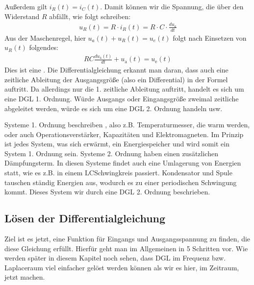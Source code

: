 \documentclass[letterpaper,10pt,english]{jupyterBook}
\begin{document}
\sphinxAtStartPar
Außerdem gilt \(i_R(t) = i_C(t)\). Damit können wir die Spannung, die über den Widerstand \(R\) abfällt, wie folgt schreiben:
\begin{equation*}
\begin{split}u_R(t) = R \cdot i_R(t) = R \cdot C\cdot \frac{du_a}{dt}\end{split}
\end{equation*}
\sphinxAtStartPar
Aus der Maschenregel, hier \( u_a(t) + u_R(t) = u_e(t)\) folgt nach Einsetzen von \(u_R(t)\) folgendes:
\begin{equation*}
\begin{split}RC \frac{du_\mathrm a (t)}{dt} + u_\mathrm a (t) = u_\mathrm e (t)\end{split}
\end{equation*}
\sphinxAtStartPar
Dies ist eine . Die Differentialgleichung erkannt man daran, dass auch eine zeitliche Ableitung der Ausgangsgröße (also ein Differential) in der Formel auftritt. Da allerdings nur die 1. zeitliche Ableitung auftritt, handelt es sich um eine DGL 1. Ordnung. Würde Ausgangs oder Eingangsgröße zweimal zeitliche abgeleitet werden, würde es sich um eine DGL 2. Ordnung handeln usw.

\sphinxAtStartPar
Systeme 1. Ordnung beschreiben , also z.B. Temperaturmesser, die warm werden, oder auch Operationsverstärker, Kapazitäten und Elektromagneten. Im Prinzip ist jedes System, was sich erwärmt, ein Energiespeicher und wird somit ein System 1. Ordnung sein. Systeme 2. Ordnung haben einen zusätzlichen Dämpfungsterm. In diesen Systeme findet auch eine Umlagerung von Energien statt, wie es z.B. in einem LC\sphinxhyphen{}Schwingkreis passiert. Kondensator und Spule tauschen ständig Energien aus, wodurch es zu einer periodischen Schwingung kommt. Dieses System wir durch eine DGL 2. Ordnung beschrieben.

\sphinxAtStartPar
{}


\subsection{Lösen der Differentialgleichung}
\label{\detokenize{content/5_DGL:losen-der-differentialgleichung}}
\sphinxAtStartPar


\sphinxAtStartPar
Ziel ist es jetzt, eine Funktion für Eingangs\sphinxhyphen{} und Ausgangsspannung zu finden, die diese Gleichung erfüllt. Hierfür geht man im Allgemeinen in 5 Schritten vor. Wie werden später in diesem Kapitel noch sehen, dass DGL im Frequenz\sphinxhyphen{} bzw. Laplaceraum viel einfacher gelöst werden können als wir es hier, im Zeitraum, jetzt machen.
\end{document}
